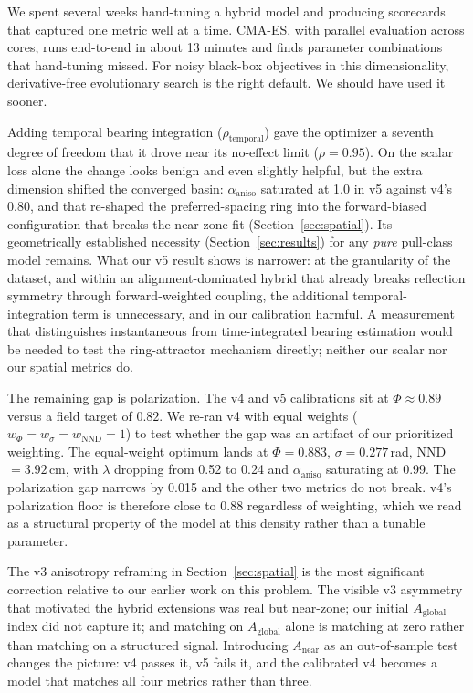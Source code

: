 \documentclass[11pt]{article}
\begin{document}
We spent several weeks hand-tuning a hybrid model and producing
scorecards that captured one metric well at a time. CMA-ES, with parallel
evaluation across cores, runs end-to-end in about 13 minutes and finds
parameter combinations that hand-tuning missed. For noisy black-box
objectives in this dimensionality, derivative-free evolutionary search
is the right default. We should have used it sooner.

Adding temporal bearing integration ($\rho_\text{temporal}$) gave the
optimizer a seventh degree of freedom that it drove near its no-effect
limit ($\rho = 0.95$). On the scalar loss alone the change looks benign
and even slightly helpful, but the extra dimension shifted the
converged basin: $\alpha_\text{aniso}$ saturated at 1.0 in v5 against
v4's 0.80, and that re-shaped the preferred-spacing ring into the
forward-biased configuration that breaks the near-zone fit
(Section~\ref{sec:spatial}). Its geometrically established necessity
(Section~\ref{sec:results}) for any \emph{pure} pull-class model
remains. What our v5 result shows is narrower: at the granularity of
the \citet{weinburd2024} dataset, and within an alignment-dominated
hybrid that already breaks reflection symmetry through forward-weighted
coupling, the additional temporal-integration term is unnecessary, and
in our calibration harmful. A measurement that distinguishes
instantaneous from time-integrated bearing estimation would be needed
to test the ring-attractor mechanism directly; neither our scalar nor
our spatial metrics do.

The remaining gap is polarization. The v4 and v5 calibrations sit at
$\Phi \approx 0.89$ versus a field target of $0.82$. We re-ran v4 with
equal weights ($w_\Phi = w_\sigma = w_\text{NND} = 1$) to test whether
the gap was an artifact of our prioritized weighting. The equal-weight
optimum lands at $\Phi = 0.883$, $\sigma = 0.277$\,rad,
NND $= 3.92$\,cm, with $\lambda$ dropping from 0.52 to 0.24 and
$\alpha_\text{aniso}$ saturating at 0.99. The polarization gap narrows
by 0.015 and the other two metrics do not break. v4's polarization
floor is therefore close to 0.88 regardless of weighting, which we
read as a structural property of the model at this density rather than
a tunable parameter.

The v3 anisotropy reframing in Section~\ref{sec:spatial} is the most
significant correction relative to our earlier work on this problem.
The visible v3 asymmetry that motivated the hybrid extensions was real
but near-zone; our initial $A_\text{global}$ index did not capture it;
and matching on $A_\text{global}$ alone is matching at zero rather than
matching on a structured signal. Introducing $A_\text{near}$ as an
out-of-sample test changes the picture: v4 passes it, v5 fails it, and
the calibrated v4 becomes a model that matches all four metrics rather
than three.
\end{document}
